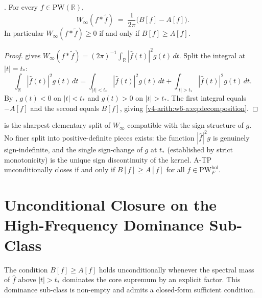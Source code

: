 \begin{lemma}
\label{v4-arith:w6-a:lem:decomposition}
\ClaimStatusProvedHere. For every \(f\in\mathrm{PW}(\mathbb{R})\),
\begin{equation}
\label{v4-arith:w6-a:eq:decomposition}
W_{\infty}(f*\widetilde{f})\;=\;\frac{1}{2\pi}\bigl(B[f]-A[f]\bigr).
\end{equation}
In particular \(W_{\infty}(f*\widetilde{f})\geq 0\) if and only if
\(B[f]\geq A[f]\).
\end{lemma}

\begin{proof}
 gives
\(W_{\infty}(f*\widetilde{f})=(2\pi)^{-1}\int_{\mathbb{R}}|\widehat{f}(t)|^{2}g(t)\,dt\).
Split the integral at \(|t|=t_{\ast}\):
\[
\int_{\mathbb{R}}|\widehat{f}(t)|^{2}g(t)\,dt
=\int_{|t|<t_{\ast}}|\widehat{f}(t)|^{2}g(t)\,dt+\int_{|t|>t_{\ast}}|\widehat{f}(t)|^{2}g(t)\,dt.
\]
By , \(g(t)<0\) on \(|t|<t_{\ast}\) and
\(g(t)>0\) on \(|t|>t_{\ast}\). The first integral equals \(-A[f]\) and the
second equals \(B[f]\), giving
\eqref{v4-arith:w6-a:eq:decomposition}.
\end{proof}

\begin{remark}
\label{v4-arith:w6-a:rem:why-not-more}
 is the sharpest elementary
split of \(W_{\infty}\) compatible with the sign structure of \(g\). No
finer split into positive-definite pieces exists: the function
\(|\widehat{f}|^{2}g\) is genuinely sign-indefinite, and the single
sign-change of \(g\) at \(t_{\ast}\) (established by strict monotonicity)
is the unique sign discontinuity of the kernel. A-TP
unconditionally closes if and only if \(B[f]\geq A[f]\) for all
\(f\in\mathrm{PW}^{\mathrm{hol}}_{F}\).
\end{remark}

\section{Unconditional Closure on the High-Frequency Dominance Sub-Class}
\label{v4-arith:w6-a:HFD-subclass}

The condition \(B[f]\geq A[f]\) holds unconditionally whenever the
spectral mass of \(\widehat{f}\) above \(|t|>t_{\ast}\) dominates the
core supremum by an explicit factor. This dominance sub-class is
non-empty and admits a closed-form sufficient condition.

